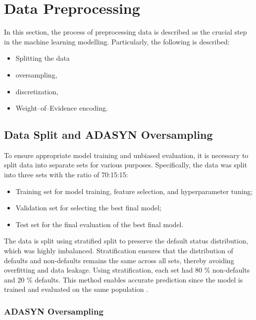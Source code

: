\section{Data Preprocessing}
In this section, the process of preprocessing data is described as the crucial step in the machine learning modelling. Particularly, the following is described:
\begin{itemize}\setlength\itemsep{0em}
\item Splitting the data
\item oversampling,
\item discretization,
\item Weight--of--Evidence encoding.
\end{itemize}


\subsection{Data Split and ADASYN Oversampling}
\label{subsec:data-split-ADASYN}

To ensure appropriate model training and unbiased evaluation, it is necessary to split data into separate sets for various purposes. Specifically, the data was split into three sets with the ratio of 70:15:15:
\begin{itemize}\setlength\itemsep{0em} 
\item Training set for model training, feature selection, and hyperparameter tuning;
\item Validation set for selecting the best final model;
\item Test set for the final evaluation of the best final model.
\end{itemize}

The data is split using stratified split to preserve the default status distribution, which was highly imbalanced.
Stratification ensures that the distribution of defaults and non-defaults remains the same across all sets, thereby avoiding overfitting and data leakage. Using stratification, each set had 80 \% non-defaults and 20 \% defaults. This method enables accurate prediction since the model is trained and evaluated on the same population \citep{igareta2021strat}.

\subsubsection{ADASYN Oversampling}

